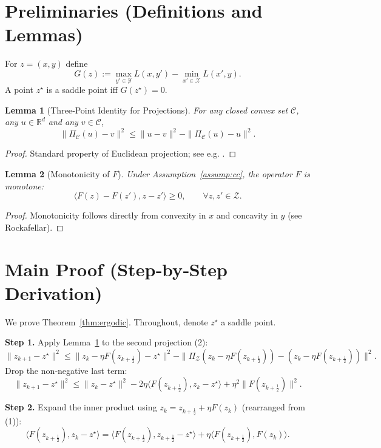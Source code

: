 \documentclass{article}
\newtheorem{lemma}{Lemma}
\begin{document}
\section*{Preliminaries (Definitions and Lemmas)}
\begin{definition}
For $z=(x,y)$ define
\[
G(z):=\max_{y'\in\mathcal{Y}}L(x,y')-\min_{x'\in\mathcal{X}}L(x',y).
\]
A point $z^{\star}$ is a saddle point iff $G(z^{\star})=0$.
\end{definition}
\begin{lemma}[Three‑Point Identity for Projections]\label{lem:proj}
For any closed convex set $\mathcal{C}$, any $u\in\mathbb{R}^{d}$ and any $v\in\mathcal{C}$,
\[
\|\Pi_{\mathcal{C}}(u)-v\|^{2}\le\|u-v\|^{2}-\|\Pi_{\mathcal{C}}(u)-u\|^{2}.
\]
\end{lemma}
\begin{proof}
Standard property of Euclidean projection; see e.g. \cite{Bauschke2011}.
\end{proof}
\begin{lemma}[Monotonicity of $F$]\label{lem:mono}
Under Assumption~\ref{assump:cc}, the operator $F$ is monotone:
\[
\langle F(z)-F(z'),z-z'\rangle\ge0,\qquad\forall z,z'\in\mathcal{Z}.
\]
\end{lemma}
\begin{proof}
Monotonicity follows directly from convexity in $x$ and concavity in $y$ (see Rockafellar).
\end{proof}

\section*{Main Proof (Step‑by‑Step Derivation)}
We prove Theorem~\ref{thm:ergodic}. Throughout, denote $z^{\star}$ a saddle point.

\noindent\textbf{Step 1.} Apply Lemma~\ref{lem:proj} to the second projection (2):
\[
\|z_{k+1}-z^{\star}\|^{2}
\le\|z_{k}-\eta F(z_{k+\frac12})-z^{\star}\|^{2}
-\|\Pi_{\mathcal{Z}}(z_{k}-\eta F(z_{k+\frac12}))-(z_{k}-\eta F(z_{k+\frac12}))\|^{2}.
\tag{3}
\]
Drop the non‑negative last term:
\[
\|z_{k+1}-z^{\star}\|^{2}
\le\|z_{k}-z^{\star}\|^{2}
-2\eta\langle F(z_{k+\frac12}),z_{k}-z^{\star}\rangle
+\eta^{2}\|F(z_{k+\frac12})\|^{2}.
\tag{4}
\]

\noindent\textbf{Step 2.} Expand the inner product using $z_{k}=z_{k+\frac12}+\eta F(z_{k})$ (rearranged from (1)):
\[
\langle F(z_{k+\frac12}),z_{k}-z^{\star}\rangle
=\langle F(z_{k+\frac12}),z_{k+\frac12}-z^{\star}\rangle
+\eta\langle F(z_{k+\frac12}),F(z_{k})\rangle .
\tag{5}
\]
\end{document}
